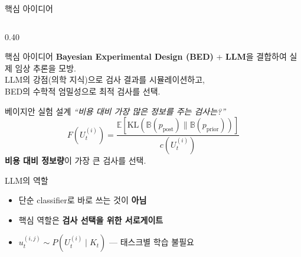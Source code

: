 \documentclass[
11pt,notheorems,hyperref={pdfauthor=whatever}
]{beamer}
\begin{document}
\begin{frame}{핵심 아이디어}
\begin{columns}[c]

\begin{column}{0.40\textwidth}

    \begin{block}{핵심 아이디어}
    \footnotesize
    \textbf{Bayesian Experimental Design (BED)} + \textbf{LLM}을 결합하여 실제 임상 추론을 모방.\\[0.4em]
    LLM의 강점(의학 지식)으로 검사 결과를 시뮬레이션하고,\\
    BED의 수학적 엄밀성으로 최적 검사를 선택.
    \end{block}

    \vspace{0.25em}

    \begin{block}{베이지안 실험 설계}
    \footnotesize
    \textit{``비용 대비 가장 많은 정보를 주는 검사는?''}\\[0.3em]
    {\scriptsize\[
        F(U_t^{(i)}) =
        \frac{\mathbb{E}[\mathrm{KL}(\mathbb{B}(p_{\text{post}})\|\mathbb{B}(p_{\text{prior}}))]}{c(U_t^{(i)})}
    \]}
    \textbf{비용 대비 정보량}이 가장 큰 검사를 선택.
    \end{block}

    \vspace{0.25em}

    \begin{block}{LLM의 역할}
    \footnotesize
    \begin{itemize}
        \item 단순 classifier로 바로 쓰는 것이 \textbf{아님}
        \item 핵심 역할은 \textbf{검사 선택을 위한 서로게이트}
        \item $u^{(i,j)}_t \sim P(U^{(i)}_t \mid K_t)$ --- 태스크별 학습 불필요
    \end{itemize}
    \end{block}

\end{column}


\end{columns}
\end{frame}
\end{document}
